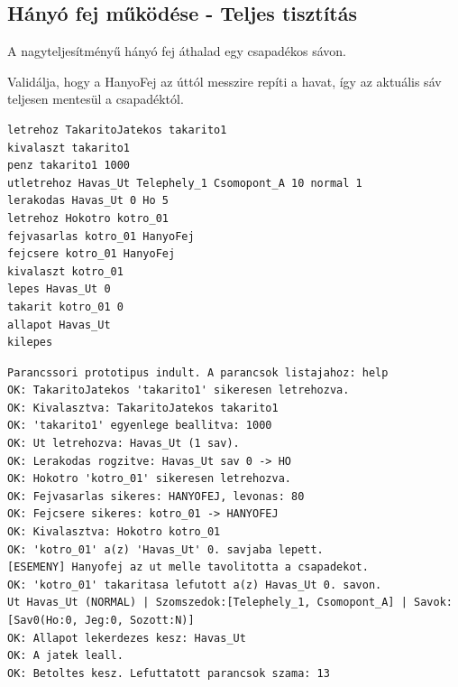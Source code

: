 \subsection{Hányó fej működése - Teljes tisztítás}
\begin{test-case-description}
    A nagyteljesítményű hányó fej áthalad egy csapadékos sávon.
\end{test-case-description}
\begin{test-case-function}
    Validálja, hogy a HanyoFej az úttól messzire repíti a havat, így az aktuális sáv teljesen mentesül a csapadéktól.
\end{test-case-function}
\begin{test-case-input}
\begin{verbatim}
letrehoz TakaritoJatekos takarito1
kivalaszt takarito1
penz takarito1 1000
utletrehoz Havas_Ut Telephely_1 Csomopont_A 10 normal 1
lerakodas Havas_Ut 0 Ho 5
letrehoz Hokotro kotro_01
fejvasarlas kotro_01 HanyoFej
fejcsere kotro_01 HanyoFej
kivalaszt kotro_01
lepes Havas_Ut 0
takarit kotro_01 0
allapot Havas_Ut
kilepes
\end{verbatim}
\end{test-case-input}
\begin{test-case-output}
\begin{verbatim}
Parancssori prototipus indult. A parancsok listajahoz: help
OK: TakaritoJatekos 'takarito1' sikeresen letrehozva.
OK: Kivalasztva: TakaritoJatekos takarito1
OK: 'takarito1' egyenlege beallitva: 1000
OK: Ut letrehozva: Havas_Ut (1 sav).
OK: Lerakodas rogzitve: Havas_Ut sav 0 -> HO
OK: Hokotro 'kotro_01' sikeresen letrehozva.
OK: Fejvasarlas sikeres: HANYOFEJ, levonas: 80
OK: Fejcsere sikeres: kotro_01 -> HANYOFEJ
OK: Kivalasztva: Hokotro kotro_01
OK: 'kotro_01' a(z) 'Havas_Ut' 0. savjaba lepett.
[ESEMENY] Hanyofej az ut melle tavolitotta a csapadekot.
OK: 'kotro_01' takaritasa lefutott a(z) Havas_Ut 0. savon.
Ut Havas_Ut (NORMAL) | Szomszedok:[Telephely_1, Csomopont_A] | Savok: [Sav0(Ho:0, Jeg:0, Sozott:N)]
OK: Allapot lekerdezes kesz: Havas_Ut
OK: A jatek leall.
OK: Betoltes kesz. Lefuttatott parancsok szama: 13
\end{verbatim}
\end{test-case-output}

